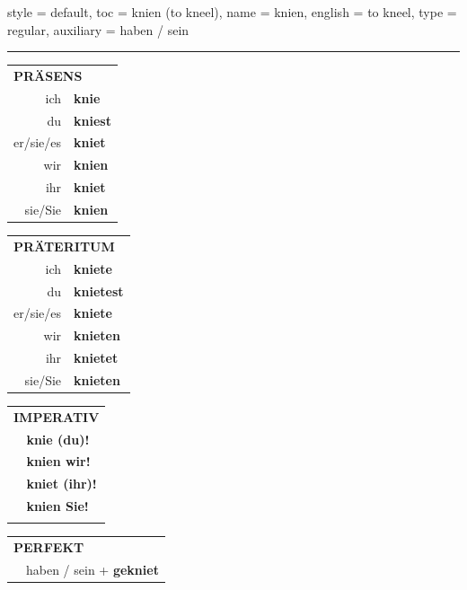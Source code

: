 \begin{verbentry}{
  style = {default},
  toc = {knien (to kneel)},
  name = {knien},
  english = {to kneel},
  type = {regular},
  auxiliary = {haben / sein}
}
 
    
     \vspace{5pt}

    \hrule
    
    \vspace{5pt}

  \begin{tabular}{rl}
     \multicolumn{2}{l}{\textbf{PRÄSENS} }\\
    ich & \textbf{knie}\\
    du & \textbf{kniest}\\
    er/sie/es & \textbf{kniet}\\
    wir & \textbf{knien}\\
    ihr & \textbf{kniet}\\
    sie/Sie & \textbf{knien}\\
  \end{tabular}
  \hfill
     \begin{tabular}{rl}
    \multicolumn{2}{l}{\textbf{PRÄTERITUM} }\\
    ich & \textbf{kniete}\\
    du & \textbf{knietest}\\
    er/sie/es & \textbf{kniete}\\
    wir & \textbf{knieten}\\
    ihr & \textbf{knietet}\\
    sie/Sie & \textbf{knieten}\\
  \end{tabular}
  \hfill
  \begin{tabular}{rl}
     \multicolumn{2}{l}{\textbf{IMPERATIV} }\\
   & \textbf{knie (du)!}\\
   & \textbf{knien wir!}\\
   & \textbf{kniet (ihr)!}\\
   & \textbf{knien Sie!}\\
   & \vspace{10pt}
  \end{tabular}

    \vspace{10pt}

 \begin{tabular}{rl}
     \multicolumn{2}{l}{\textbf{PERFEKT}}\\
  &  haben / sein + \textbf{gekniet}\\
  \end{tabular}
\hfill
   \begin{tabular}{rl}
   

\end{tabular}
\end{verbentry}
